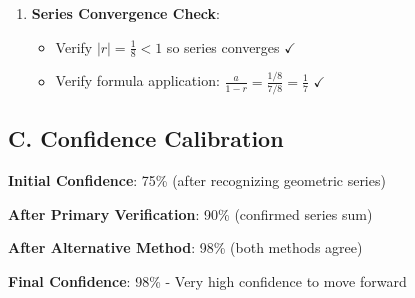 \documentclass[11pt]{article}
\begin{document}
\begin{verificationbox}
\begin{enumerate}
    \item \textbf{Series Convergence Check}:
    \begin{itemize}
        \item Verify $|r| = \frac{1}{8} < 1$ so series converges $\checkmark$
        \item Verify formula application: $\frac{a}{1-r} = \frac{1/8}{7/8} = \frac{1}{7}$ $\checkmark$
    \end{itemize}
\end{enumerate}

\subsection*{C. Confidence Calibration}

\textbf{Initial Confidence}: 75\% (after recognizing geometric series)

\textbf{After Primary Verification}: 90\% (confirmed series sum)

\textbf{After Alternative Method}: 98\% (both methods agree)

\textbf{Final Confidence}: 98\% - Very high confidence to move forward
\end{verificationbox}
\end{document}
